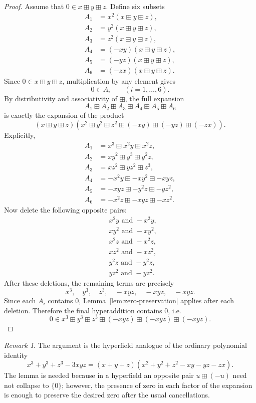 \documentclass{article}
\theoremstyle{remark}
\newtheorem{remark}{Remark}
\begin{document}
\begin{proof}
Assume that $0\in x\boxplus y\boxplus z$. Define six subsets
\[
\begin{aligned}
A_1 &= x^2(x\boxplus y\boxplus z),\\
A_2 &= y^2(x\boxplus y\boxplus z),\\
A_3 &= z^2(x\boxplus y\boxplus z),\\
A_4 &= (-xy)(x\boxplus y\boxplus z),\\
A_5 &= (-yz)(x\boxplus y\boxplus z),\\
A_6 &= (-zx)(x\boxplus y\boxplus z).
\end{aligned}
\]
Since $0\in x\boxplus y\boxplus z$, multiplication by any element gives
\[
0\in A_i \qquad (i=1,\dots,6).
\]
By distributivity and associativity of $\boxplus$, the full expansion
\[
A_1\boxplus A_2\boxplus A_3\boxplus A_4\boxplus A_5\boxplus A_6
\]
is exactly the expansion of the product
\[
(x\boxplus y\boxplus z)\left(x^2\boxplus y^2\boxplus z^2\boxplus (-xy)\boxplus (-yz)\boxplus (-zx)\right).
\]
Explicitly,
\[
\begin{aligned}
A_1 &= x^3\boxplus x^2y\boxplus x^2z,\\
A_2 &= xy^2\boxplus y^3\boxplus y^2z,\\
A_3 &= xz^2\boxplus yz^2\boxplus z^3,\\
A_4 &= -x^2y\boxplus -xy^2\boxplus -xyz,\\
A_5 &= -xyz\boxplus -y^2z\boxplus -yz^2,\\
A_6 &= -x^2z\boxplus -xyz\boxplus -xz^2.
\end{aligned}
\]
Now delete the following opposite pairs:
\[
\begin{aligned}
&x^2y \text{ and } -x^2y,\\
&xy^2 \text{ and } -xy^2,\\
&x^2z \text{ and } -x^2z,\\
&xz^2 \text{ and } -xz^2,\\
&y^2z \text{ and } -y^2z,\\
&yz^2 \text{ and } -yz^2.
\end{aligned}
\]
After these deletions, the remaining terms are precisely
\[
x^3,\quad y^3,\quad z^3,\quad -xyz,\quad -xyz,\quad -xyz.
\]
Since each $A_i$ contains $0$, Lemma~\ref{lem:zero-preservation} applies after each 
deletion. Therefore the final hyperaddition contains $0$, i.e.
\[
0\in x^3\boxplus y^3\boxplus z^3\boxplus (-xyz)\boxplus (-xyz)\boxplus (-xyz).
\]
\end{proof}

\begin{remark}
The argument is the hyperfield analogue of the ordinary polynomial identity
\[
x^3+y^3+z^3-3xyz=(x+y+z)(x^2+y^2+z^2-xy-yz-zx).
\]
The lemma is needed because in a hyperfield an opposite pair $u\boxplus(-u)$ need not 
collapse to $\{0\}$; however, the presence of zero in each factor of the expansion 
is enough to preserve the desired zero after the usual cancellations.
\end{remark}
\end{document}
